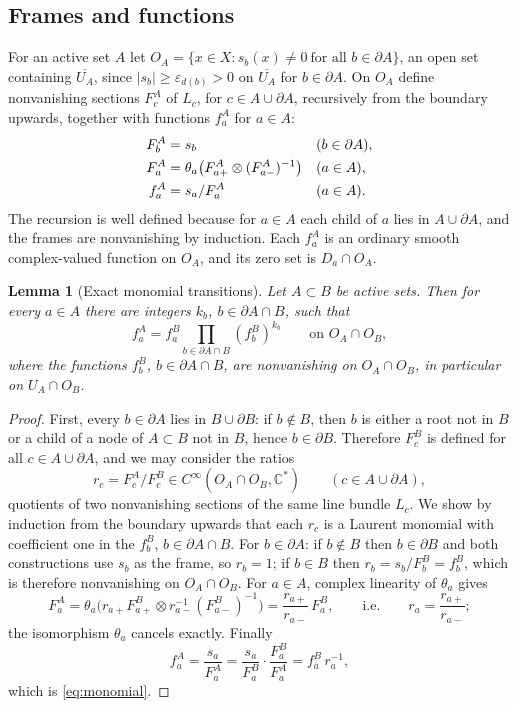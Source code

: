 \documentclass[12pt]{article}
\newtheorem{lemma}[theorem]{Lemma}
\theoremstyle{remark}
\newcommand{\C}{\mathbb C}
\newcommand{\eps}{\varepsilon}
\begin{document}
\subsection*{Frames and functions}
For an active set $A$ let
$O_A=\{x\in X: s_b(x)\ne0\ \text{for all }b\in\partial A\}$, an open
set containing $\overline{U_A}$, since $|s_b|\ge\eps_{d(b)}>0$ on
$\overline{U_A}$ for $b\in\partial A$. On $O_A$ define nonvanishing
sections $F^A_c$ of $L_c$, for $c\in A\cup\partial A$, recursively from
the boundary upwards, together with functions $f^A_a$ for $a\in A$:
\begin{align}
 F^A_b&=s_b &&(b\in\partial A),\label{eq:frames}\\
 F^A_a&=\theta_a\bigl(F^A_{a+}\otimes(F^A_{a-})^{-1}\bigr) &&(a\in A),\notag\\
 f^A_a&=s_a/F^A_a &&(a\in A).\label{eq:functions}
\end{align}
The recursion is well defined because for $a\in A$ each child of $a$
lies in $A\cup\partial A$, and the frames are nonvanishing by
induction. Each $f^A_a$ is an ordinary smooth complex-valued function
on $O_A$, and its zero set is $D_a\cap O_A$.

\begin{lemma}[Exact monomial transitions]\label{lem:monomial}
Let $A\subset B$ be active sets. Then for every $a\in A$ there are
integers $k_b$, $b\in\partial A\cap B$, such that
\begin{equation}\label{eq:monomial}
 f^A_a=f^B_a\prod_{b\in\partial A\cap B}(f^B_b)^{k_b}
 \qquad\text{on }O_A\cap O_B,
\end{equation}
where the functions $f^B_b$, $b\in\partial A\cap B$, are nonvanishing
on $O_A\cap O_B$, in particular on $U_A\cap O_B$.
\end{lemma}

\begin{proof}
First, every $b\in\partial A$ lies in $B\cup\partial B$: if $b\notin B$,
then $b$ is either a root not in $B$ or a child of a node of
$A\subset B$ not in $B$, hence $b\in\partial B$. Therefore $F^B_c$ is
defined for all $c\in A\cup\partial A$, and we may consider the ratios
\[
 r_c=F^A_c/F^B_c\in C^\infty(O_A\cap O_B,\C^*)
\qquad(c\in A\cup\partial A),
\]
quotients of two nonvanishing sections of the same line bundle $L_c$.
We show by induction from the boundary upwards that each $r_c$ is a
Laurent monomial with coefficient one in the $f^B_b$, $b\in\partial A\cap B$.
For $b\in\partial A$: if $b\notin B$ then $b\in\partial B$ and both
constructions use $s_b$ as the frame, so $r_b=1$; if $b\in B$ then
$r_b=s_b/F^B_b=f^B_b$, which is therefore nonvanishing on
$O_A\cap O_B$. For $a\in A$, complex linearity of $\theta_a$ gives
\[
 F^A_a=\theta_a\bigl(r_{a+}F^B_{a+}\otimes r_{a-}^{-1}(F^B_{a-})^{-1}\bigr)
 =\frac{r_{a+}}{r_{a-}}\,F^B_a,
 \qquad\text{i.e.}\qquad r_a=\frac{r_{a+}}{r_{a-}} ;
\]
the isomorphism $\theta_a$ cancels exactly. Finally
\[
 f^A_a=\frac{s_a}{F^A_a}=\frac{s_a}{F^B_a}\cdot\frac{F^B_a}{F^A_a}
 =f^B_a\,r_a^{-1},
\]
which is \eqref{eq:monomial}.
\end{proof}
\end{document}
